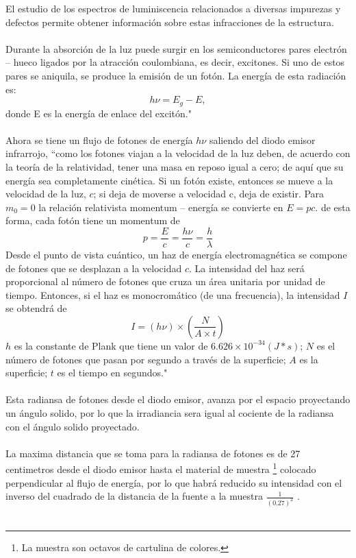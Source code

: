 \documentclass[12]{article}
\begin{document}
\begin{multicols}{2}
El estudio de los espectros de luminiscencia relacionados a diversas impurezas y defectos permite obtener información sobre estas infracciones de la estructura. \\ \\
Durante la absorción de la luz puede surgir en los semiconductores pares electrón – hueco ligados por la atracción coulombiana, es decir, excitones. Si uno de estos pares se aniquila, se produce la emisión de un fotón. La energía de esta radiación es: 
\begin{equation}
h\nu = E_g - E,
\end{equation}
donde E es la energía de enlace del excitón." \cite{SEMICONDUCTOR} \\ \\
Ahora se tiene un flujo de fotones de energía $h\nu$ saliendo del diodo emisor infrarrojo,  ``como los fotones viajan a la velocidad de la luz deben, de acuerdo con la teoría de la relatividad, tener una masa en reposo igual a cero; de aquí que su energía sea completamente cinética. Si un fotón existe, entonces se mueve a la velocidad de la luz, $c$; si deja de moverse a velocidad c, deja de existir. Para $m_{0} = 0$ la relación relativista momentum – energía  se convierte en $E = pc$.
de esta forma, cada fotón tiene un momentum de 
\begin{equation}
p = \frac{E}{c} = \frac{h\nu}{c} = \frac{h}{\lambda}
\end{equation}
Desde el punto de vista cuántico, un haz de energía electromagnética se compone de fotones que se desplazan a la velocidad $c$. La intensidad del haz será proporcional al número de fotones que cruza un área unitaria por unidad de tiempo. Entonces, si el haz es monocromático (de una frecuencia), la intensidad $I$ se obtendrá de 
\begin{equation}
I = (h\nu)\times \left ( \frac{N}{A\times t } \right)
\end{equation}
$h$ es la constante de Plank que tiene un valor de $6.626 \times 10^{-34} (J * s)$; $N$ es el número de fotones que pasan por segundo a través de la superficie; $A$ es la superficie; $t$ es el tiempo en segundos."\cite{FISICA_MODERNA}\\ \\
Esta radiansa de fotones desde el diodo emisor, avanza por el espacio proyectando un ángulo solido, por lo que la irradiancia  sera igual al cociente de la radiansa con el ángulo solido proyectado.\\\\
La maxima distancia que se toma para la radiansa de fotones es de 27 centimetros desde el diodo emisor hasta el material de muestra \footnote{La muestra son octavos de cartulina de colores.} colocado perpendicular al flujo de energía, por lo que habrá reducido su intensidad con el inverso del cuadrado de la distancia de la fuente a la muestra $\frac{1}{(0.27)^{2}}$ .\\\\

\end{multicols}
\end{document}
